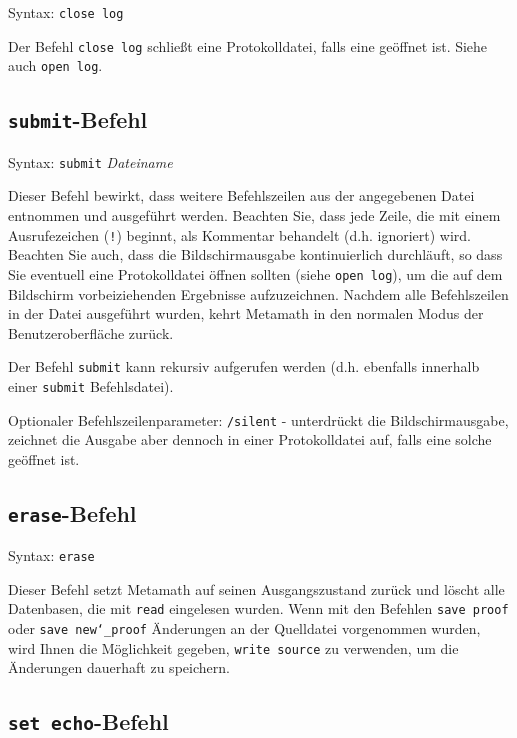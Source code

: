 Syntax:  \texttt{close log}

Der Befehl \texttt{close log} schließt eine Protokolldatei, falls eine geöffnet ist.  Siehe auch \texttt{open log}.


\subsection{\texttt{submit}-Befehl}\label{sbmt}

Syntax:  \texttt{submit} {\em Dateiname}

Dieser Befehl bewirkt, dass weitere Befehlszeilen aus der angegebenen Datei entnommen und ausgeführt werden.  Beachten Sie, dass jede Zeile, die mit einem Ausrufezeichen (\texttt{!}) beginnt, als Kommentar behandelt (d.h. ignoriert) wird.  Beachten Sie auch, dass die Bildschirmausgabe kontinuierlich durchläuft, so dass Sie eventuell eine Protokolldatei öffnen sollten (siehe \texttt{open log}), um die auf dem Bildschirm vorbeiziehenden Ergebnisse aufzuzeichnen. Nachdem alle Befehlszeilen in der Datei ausgeführt wurden, kehrt Metamath in den normalen Modus der Benutzeroberfläche zurück.

Der Befehl \texttt{submit} kann rekursiv aufgerufen werden (d.h. ebenfalls innerhalb einer \texttt{submit} Befehlsdatei).

Optionaler Befehlszeilenparameter:
\texttt{/silent} - unterdrückt die Bildschirmausgabe, zeichnet die Ausgabe aber dennoch in einer Protokolldatei auf, falls eine solche geöffnet ist.


\subsection{\texttt{erase}-Befehl}

Syntax:  \texttt{erase}

Dieser Befehl setzt Metamath auf seinen Ausgangszustand zurück und löscht alle Datenbasen, die mit \texttt{read} eingelesen wurden.  Wenn mit den Befehlen \texttt{save proof} oder \texttt{save new{\char`\_}proof} Änderungen an der Quelldatei vorgenommen wurden, wird Ihnen die Möglichkeit gegeben, \texttt{write source} zu verwenden, um die Änderungen dauerhaft zu speichern.


\subsection{\texttt{set echo}-Befehl}

